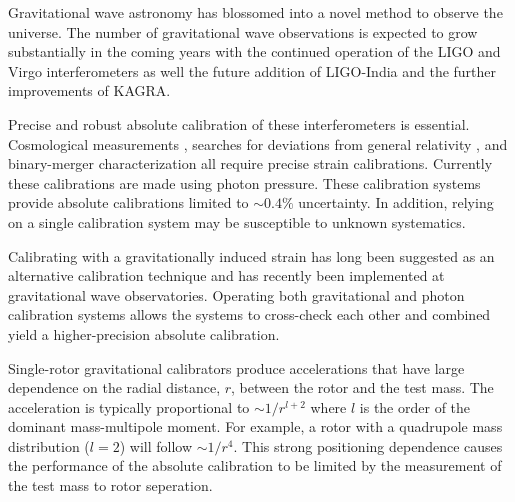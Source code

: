 \documentclass[superscriptaddress, twocolumn, prd]{revtex4-1}
\begin{document}
Gravitational wave astronomy has blossomed into a novel method to observe the universe. The number of gravitational wave observations is expected to grow substantially in the coming years with the continued operation of the LIGO \cite{aLIGO} and Virgo \cite{virgo} interferometers as well the future addition of LIGO-India \cite{ligo-india} and the further improvements of KAGRA. \cite{kagra}

Precise and robust absolute calibration of these interferometers is essential. Cosmological measurements \cite{abbott2021gravitational, ligo2017gravitational, schutz1986determining}, searches for deviations from general relativity \cite{abbott2020tests}, and binary-merger characterization \cite{abbott2020population} all require precise strain calibrations. Currently these calibrations are made using photon pressure. \cite{PCal} These calibration systems provide absolute calibrations limited to $\sim0.4\%$ uncertainty. \cite{Bhattacharjee_2020} In addition, relying on a single calibration system may be susceptible to unknown systematics.

%

Calibrating with a gravitationally induced strain has long been suggested as an alternative calibration technique \cite{hirakawa1980dynamical, kuroda1985experimental, mio1987experimental, astone1991evaluation, astone1998experimental, Matone_2007} and has recently been implemented at gravitational wave observatories. \cite{Estevez_2018, estevez2021newtonian, PhysRevD.98.022005, ncal} Operating both gravitational and photon calibration systems allows the systems to cross-check each other and combined yield a higher-precision absolute calibration.

Single-rotor gravitational calibrators \cite{Estevez_2018, estevez2021newtonian, PhysRevD.98.022005, ncal} produce accelerations that have large dependence on the radial distance, $r$, between the rotor and the test mass. The acceleration is typically proportional to $\sim1/r^{l+2}$ where $l$ is the order of the dominant mass-multipole moment. For example, a rotor with a quadrupole mass distribution ($l=2$) will follow $\sim1/r^4$. This strong positioning dependence causes the performance of the absolute calibration to be limited by the measurement of the test mass to rotor seperation.
\end{document}

